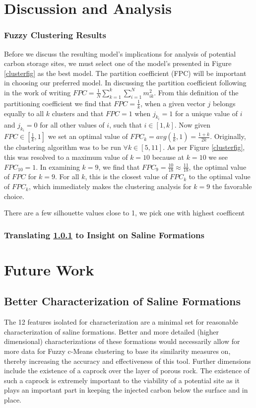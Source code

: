 \documentclass[letterpaper, 12pt]{article}
\begin{document}
\section{Discussion and Analysis}
\subsubsection{Fuzzy Clustering Results}\label{fcmr}
Before we discuss the resulting model's implications for analysis of potential carbon storage sites, we must select one of the model's presented in Figure \ref{clusterfig} as the best model. 
The partition coefficient (FPC) will be important in choosing our preferred model. In discussing the partition coefficient following in the work of \cite{dunnbar} writing $FPC = \frac{1}{N}\sum_{k = 1}^k \sum_{i = 1}^N m_{ik}^2$. From this definition of the partitioning coefficient we find that $FPC = \frac{1}{k}$, when a given vector $j$ belongs equally to all $k$ clusters and that $FPC = 1$ when $j_{k_i} = 1$ for a unique value of $i$ and $j_{k_i} = 0$ for all other values of $i$, such that $i \in [1, k]$. Now given $FPC \in [\frac{1}{k}, 1]$ we set an optimal value of $FPC_k = avg(\frac{1}{k}, 1) =  \frac{1+k}{2k}$. 
Originally, the clustering algorithm was to be run $\forall k \in [5,11]$. As per Figure \ref{clusterfig}, this was resolved to a maximum value of $k = 10$ because at $k = 10$ we see $FPC_10 = 1$. In examining $k = 9$, we find that $FPC_9 = \frac{10}{18} \approx \frac{11}{18}$, the optimal value of $FPC$ for $k = 9$. For all $k$, this is the closest value of $FPC_k$ to the optimal value of $FPC_k$, which immediately makes the clustering analysis for $k = 9$ the favorable choice. 




There are a few silhouette values close to 1, we pick one with highest coefficent 
\subsubsection{Translating \ref{fcmr} to Insight on Saline Formations} 

\section{Future Work}
\subsection{Better Characterization of Saline Formations}\cite{betterchar}
The 12 features isolated for characterization are a minimal set for reasonable characterization of saline formations. Better and more detailed (higher dimensional) characterizations of these formations would necessarily allow for more data for Fuzzy c-Means clustering to base its similarity measures on, thereby increasing the accuracy and effectiveness of this tool. Further dimensions include the existence of a caprock over the layer of porous rock. The existence of such a caprock is extremely important to the viability of a potential site as it plays an important part in keeping the injected carbon below the surface and in place.  
\end{document}
